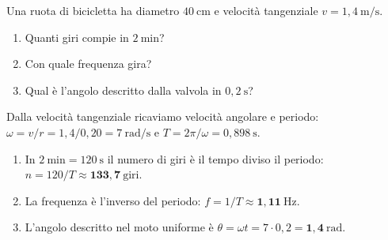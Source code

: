 
\begin{question}[ID=1.8, subtitle={Ruota di bicicletta — giri, frequenza e angolo}, tags={moto circolare}, difficulty=media]
Una ruota di bicicletta ha diametro $40\ \mathrm{cm}$ e velocità tangenziale $v = 1{,}4\ \mathrm{m/s}$.
\begin{enumerate}
\item Quanti giri compie in $2\ \mathrm{min}$?
\item Con quale frequenza gira?
\item Qual è l'angolo descritto dalla valvola in $0{,}2\ \mathrm{s}$?
\end{enumerate}
\begin{solution}
Dalla velocità tangenziale ricaviamo velocità angolare e periodo: $\omega = v/r = 1{,}4/0{,}20 = 7\ \mathrm{rad/s}$ e $T = 2\pi/\omega = 0{,}898\ \mathrm{s}$.
\begin{enumerate}
\item In $2\ \mathrm{min} = 120\ \mathrm{s}$ il numero di giri è il tempo diviso il periodo: $n = 120/T \approx \mathbf{133{,}7\ \mathrm{giri}}$.
\item La frequenza è l'inverso del periodo: $f = 1/T \approx \mathbf{1{,}11\ \mathrm{Hz}}$.
\item L'angolo descritto nel moto uniforme è $\theta = \omega t = 7\cdot 0{,}2 = \mathbf{1{,}4\ \mathrm{rad}}$.
\end{enumerate}
\end{solution}
\end{question}


